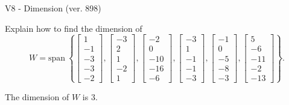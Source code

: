 \begin{exercise}
  \begin{exerciseTitle}V8 - Dimension (ver. 898)\end{exerciseTitle}
  \begin{exerciseStatement}
    Explain how to find the dimension of 
\[W=\mathrm{span}\ \left\{\left[\begin{array}{r}
1 \\
-1 \\
-3 \\
-3 \\
-2
\end{array}\right] , \left[\begin{array}{r}
-3 \\
2 \\
1 \\
-2 \\
1
\end{array}\right] , \left[\begin{array}{r}
-2 \\
0 \\
-10 \\
-16 \\
-6
\end{array}\right] , \left[\begin{array}{r}
-3 \\
1 \\
-1 \\
-1 \\
-3
\end{array}\right] , \left[\begin{array}{r}
-1 \\
0 \\
-5 \\
-8 \\
-3
\end{array}\right] , \left[\begin{array}{r}
5 \\
-6 \\
-11 \\
-2 \\
-13
\end{array}\right]\right\}.\]



  \end{exerciseStatement}
  \begin{exerciseAnswer}
   The dimension of \(W\) is  \(3\).
  


  \end{exerciseAnswer}
\end{exercise}